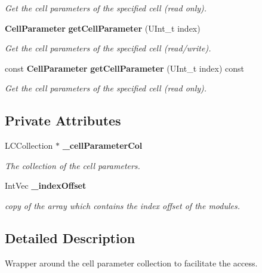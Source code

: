 \begin{DoxyCompactItemize}
\begin{DoxyCompactList}\small\item\em Get the cell parameters of the specified cell (read only). \item\end{DoxyCompactList}\item 
{\bf CellParameter} {\bf getCellParameter} (UInt\_\-t index)
\begin{DoxyCompactList}\small\item\em Get the cell parameters of the specified cell (read/write). \item\end{DoxyCompactList}\item 
const {\bf CellParameter} {\bf getCellParameter} (UInt\_\-t index) const 
\begin{DoxyCompactList}\small\item\em Get the cell parameters of the specified cell (read only). \item\end{DoxyCompactList}\end{DoxyCompactItemize}
\subsection*{Private Attributes}
\begin{DoxyCompactItemize}
\item 
LCCollection $\ast$ {\bf \_\-cellParameterCol}\label{classCALICE_1_1CellParameterAccess_a78debadc2027f233e522893ab8132f38}

\begin{DoxyCompactList}\small\item\em The collection of the cell parameters. \item\end{DoxyCompactList}\item 
IntVec {\bf \_\-indexOffset}
\begin{DoxyCompactList}\small\item\em copy of the array which contains the index offset of the modules. \item\end{DoxyCompactList}\end{DoxyCompactItemize}


\subsection{Detailed Description}
Wrapper around the cell parameter collection to facilitate the access. 

